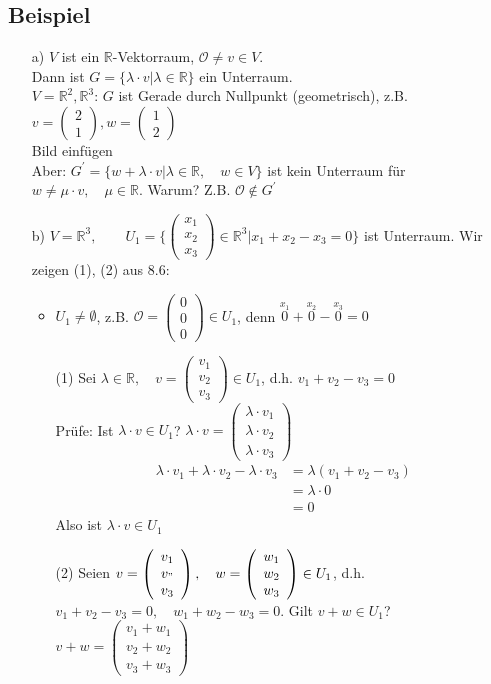 \documentclass[12pt, titlepage]{article}
\newcommand{\R}{\mathds{R}}
\renewcommand{\vec}[1]{\left(\begin{array}{c}#1
	\end{array}\right)}
\renewcommand{\O}{\mathcal{O}}
\renewcommand{\>}{\rightarrow}
\renewcommand{\*}{\cdot}
\begin{document}
	\subsection{Beispiel}
	\begin{itemize}
		\item[a)] $V$ ist ein $\R$-Vektorraum, $\O\neq v\in V$.\\
		Dann ist $G=\{\lambda\*v|\lambda\in\R\}$ ein Unterraum.\\
		$V=\R^2,\R^3$: $G$ ist Gerade durch Nullpunkt (geometrisch), z.B. $v=\vec{2\\1},w=\vec{1\\2}$\\
		Bild einfügen\\
		Aber: $G^\prime=\{w+\lambda\*v|\lambda\in\R,\quad w\in V\}$ ist kein Unterraum für $w\neq \mu\*v,\quad \mu\in\R$. Warum? Z.B. $\O\notin G^\prime$
	\item[b)] $V=\R^3,\qquad U_1=\{\vec{x_1\\x_2\\x_3}\in\R^3|x_1+x_2-x_3=0\}$ ist Unterraum. Wir zeigen (1), (2) aus 8.6:
	\begin{itemize}
		\item $U_1\neq\emptyset$, z.B. $\O=\vec{0\\0\\0}\in U_1$, denn $\overset{x_1}{0}+\overset{x_2}{0}-\overset{x_3}{0}=0$
		\item[(1)] Sei $\lambda\in\R,\quad v=\vec{v_1\\v_2\\v_3}\in U_1$, d.h. $v_1+v_2-v_3=0$\\
		Prüfe: Ist $\lambda\*v\in U_1$? $\lambda\*v=\vec{\lambda\*v_1\\\lambda\*v_2\\\lambda\*v_3}$
		\begin{align*}
			\lambda\*v_1+\lambda\*v_2-\lambda\*v_3&=\lambda(v_1+v_2-v_3)\\
			&=\lambda\*0\\
			&=0
		\end{align*}
		Also ist $\lambda\*v\in U_1$
		\item[(2)] Seien $v=\vec{v_1\\v_"\\v_3},\quad w=\vec{w_1\\w_2\\w_3}\in U_1$, d.h. $v_1+v_2-v_3=0,\quad w_1+w_2-w_3=0$. Gilt $v+w\in U_1$? $v+w=\vec{v_1+w_1\\v_2+w_2\\v_3+w_3}$

\end{itemize}
\end{itemize}
\end{document}
